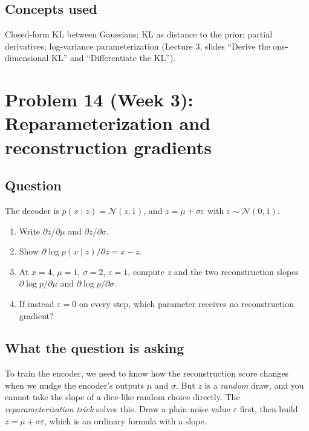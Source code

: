 \documentclass[12pt,a4paper]{article}
\begin{document}
\subsection{Concepts used}

Closed-form KL between Gaussians; KL as distance to the prior; partial derivatives; log-variance parameterization (Lecture 3, slides ``Derive the one-dimensional KL'' and ``Differentiate the KL'').

\section{Problem 14 (Week 3): Reparameterization and reconstruction gradients}

\subsection{Question}

The decoder is $p(x \mid z) = \mathcal{N}(z, 1)$, and $z = \mu + \sigma\varepsilon$ with $\varepsilon \sim \mathcal{N}(0, 1)$.

\begin{enumerate}[leftmargin=*]
\item Write $\partial z/\partial\mu$ and $\partial z/\partial\sigma$.
\item Show $\partial \log p(x \mid z)/\partial z = x - z$.
\item At $x = 4$, $\mu = 1$, $\sigma = 2$, $\varepsilon = 1$, compute $z$ and the two reconstruction slopes $\partial \log p/\partial\mu$ and $\partial \log p/\partial\sigma$.
\item If instead $\varepsilon = 0$ on every step, which parameter receives no reconstruction gradient?
\end{enumerate}

\subsection{What the question is asking}

To train the encoder, we need to know how the reconstruction score changes when we nudge the encoder's outputs $\mu$ and $\sigma$. But $z$ is a \emph{random} draw, and you cannot take the slope of a dice-like random choice directly. The \emph{reparameterization trick} solves this. Draw a plain noise value $\varepsilon$ first, then build $z = \mu + \sigma\varepsilon$, which is an ordinary formula with a slope.
\end{document}
